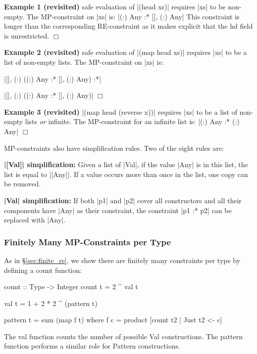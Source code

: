 \documentclass[preprint]{sigplanconf}
\newcommand{\C}[1]{\textsf{#1}}
\newcommand{\noexample}{\hfill\ensuremath{\Box}\par\addvspace{2mm}}
\newcommand{\para}[1]{\vspace{2mm}\noindent\textbf{#1}}
\newenvironment{revisit}[1]
    {\addvspace{2mm}\noindent\textbf{Example #1 (revisited)}}
    {\noexample}
\begin{document}
\begin{revisit}{1} safe evaluation of |(head xs)| requires |xs| to be non-empty. The MP-constraint on |xs| is: |{(:) Any} :* {[], (:) Any}| This constraint is longer than the corresponding RE-constraint as it makes explicit that the \C{hd} field is unrestricted.
\end{revisit}

\begin{revisit}{2} safe evaluation of |(map head xs)| requires |xs| to be a list of non-empty lists. The MP-constraint on |xs| is:

\smallskip
\par\noindent |{[], (:) ({(:) Any} :* {[], (:) Any})} :*|
\par\noindent |{[], (:) ({(:) Any} :* {[], (:) Any})}|
\end{revisit}

\begin{revisit}{3} |(map head (reverse x))| requires |xs| to be a list of non-empty lists \textit{or} infinite. The MP-constraint for an infinite list is: |{(:) Any} :* {(:) Any}|
\end{revisit}

MP-constraints also have simplification rules.  Two of the eight rules are:

\para{|[Val]| simplification:} Given a list of |Val|, if the value |Any| is in this list, the list is equal to |[Any]|. If a value occurs more than once in the list, one copy can be removed.

\para{|Val| simplification:} If both |p1| and |p2| cover all constructors and all their components have |Any| as their constraint, the constraint |p1 :* p2| can be replaced with |Any|.


\subsubsection{Finitely Many MP-Constraints per Type}

As in \S\ref{sec:finite_re}, we show there are finitely many constraints per type by defining a \C{count} function:

\begin{code}
count :: Type -> Integer
count t = 2 ^ val t

val t = 1 + 2 * 2 ^ (pattern t)

pattern t = sum (map f t)
    where f c = product [count t2 | Just t2 <- c]
\end{code}

The \C{val} function counts the number of possible \C{Val} constructions. The \C{pattern} function performs a similar role for \C{Pattern} constructions.
\end{document}
